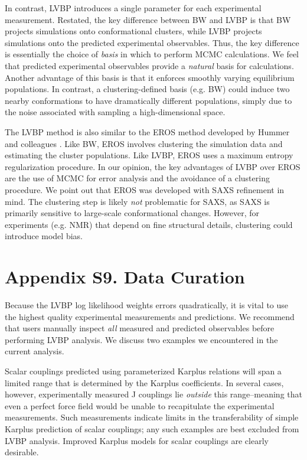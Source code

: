 \documentclass[journal=jacsat,manuscript=article]{achemso}
\begin{document}
In contrast, LVBP introduces a single parameter for each experimental measurement.  Restated, the key difference between BW and LVBP is that BW projects simulations onto conformational clusters, while LVBP projects simulations onto the predicted experimental observables.  Thus, the key difference is essentially the choice of \emph{basis} in which to perform MCMC calculations.  We feel that predicted experimental observables provide a \emph{natural} basis for calculations.  Another advantage of this basis is that it enforces smoothly varying equilibrium populations.  In contrast, a clustering-defined basis (e.g. BW) could induce two nearby conformations to have dramatically different populations, simply due to the noise associated with sampling a high-dimensional space.  

The LVBP method is also similar to the EROS method developed by Hummer and colleagues \cite{rozycki2011saxs}.  Like BW, EROS involves clustering the simulation data and estimating the cluster populations.  Like LVBP, EROS uses a maximum entropy regularization procedure.  In our opinion, the key advantages of LVBP over EROS are the use of MCMC for error analysis and the avoidance of a clustering procedure.  We point out that EROS was developed with SAXS refinement in mind.  The clustering step is likely \emph{not} problematic for SAXS, as SAXS is primarily sensitive to large-scale conformational changes.  However, for experiments (e.g. NMR) that depend on fine structural details, clustering could introduce model bias.  

\section{Appendix S9. Data Curation}

Because the LVBP log likelihood weights errors quadratically, it is vital to use the highest quality experimental measurements and predictions.  We recommend that users manually inspect \emph{all} measured and predicted observables before performing LVBP analysis.  We discuss two examples we encountered in the current analysis.  

Scalar couplings predicted using parameterized Karplus relations will span a limited range that is determined by the Karplus coefficients.  In several cases, however, experimentally measured J couplings lie \emph{outside} this range--meaning that even a perfect force field would be unable to recapitulate the experimental measurements.  Such measurements indicate limits in the transferability of simple Karplus prediction of scalar couplings; any such examples are best excluded from LVBP analysis.  Improved  Karplus models for scalar couplings are clearly desirable.  
\end{document}
